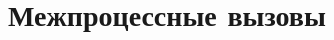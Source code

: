 \documentclass[forwardcom.tex]{subfiles}
\begin{document}
\section{Межпроцессные вызовы} \label{interProcessCalls}
%
%
%
%
%
\end{document}
